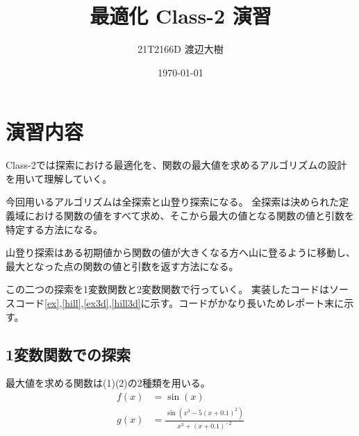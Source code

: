 \documentclass[a4paper,11pt,dvipdfmx]{jsarticle}
\begin{document}

\title{最適化 Class-2 演習}
\author{21T2166D 渡辺大樹}
\date{\today}
\maketitle

\section{演習内容}
Class-2では探索における最適化を、関数の最大値を求めるアルゴリズムの設計を用いて理解していく。

今回用いるアルゴリズムは全探索と山登り探索になる。
全探索は決められた定義域における関数の値をすべて求め、そこから最大の値となる関数の値と引数を特定する方法になる。

山登り探索はある初期値から関数の値が大きくなる方へ山に登るように移動し、最大となった点の関数の値と引数を返す方法になる。

この二つの探索を1変数関数と2変数関数で行っていく。
実装したコードはソースコード\ref{ex},\ref{hill},\ref{ex3d},\ref{hill3d}に示す。コードがかなり長いためレポート末に示す。

\subsection{1変数関数での探索}
最大値を求める関数は(1)(2)の2種類を用いる。
\begin{align}
    f(x) &= \sin(x)\\
    g(x) &= \frac{\sin(x^3-5(x+0.1)^2)}{x^3+(x+0.1)^{-2}}
\end{align}







\end{document}
